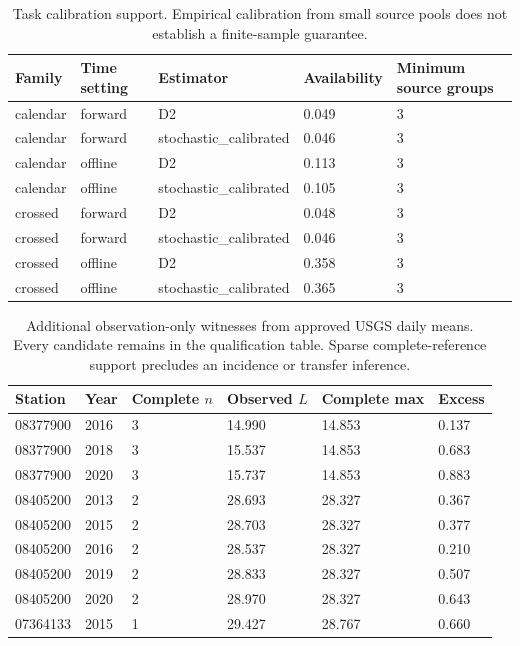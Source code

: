 \begin{table}[p]\centering\small
\caption{Task calibration support. Empirical calibration from small source pools does not establish a finite-sample guarantee.}\label{tab:task-calibration-support}
\begin{tabular}{lllll}
\toprule
Family & Time setting & Estimator & Availability & Minimum source groups\\\midrule
calendar & forward & D2 & 0.049 & 3\\
calendar & forward & stochastic\_calibrated & 0.046 & 3\\
calendar & offline & D2 & 0.113 & 3\\
calendar & offline & stochastic\_calibrated & 0.105 & 3\\
crossed & forward & D2 & 0.048 & 3\\
crossed & forward & stochastic\_calibrated & 0.046 & 3\\
crossed & offline & D2 & 0.358 & 3\\
crossed & offline & stochastic\_calibrated & 0.365 & 3\\
\bottomrule\end{tabular}
\end{table}
\begin{table}[p]\centering\small
\caption{Additional observation-only witnesses from approved USGS daily means. Every candidate remains in the qualification table. Sparse complete-reference support precludes an incidence or transfer inference.}\label{tab:additional-observed-records}
\begin{tabular}{llllll}
\toprule
Station & Year & Complete $n$ & Observed $L$ & Complete max & Excess\\\midrule
08377900 & 2016 & 3 & 14.990 & 14.853 & 0.137\\
08377900 & 2018 & 3 & 15.537 & 14.853 & 0.683\\
08377900 & 2020 & 3 & 15.737 & 14.853 & 0.883\\
08405200 & 2013 & 2 & 28.693 & 28.327 & 0.367\\
08405200 & 2015 & 2 & 28.703 & 28.327 & 0.377\\
08405200 & 2016 & 2 & 28.537 & 28.327 & 0.210\\
08405200 & 2019 & 2 & 28.833 & 28.327 & 0.507\\
08405200 & 2020 & 2 & 28.970 & 28.327 & 0.643\\
07364133 & 2015 & 1 & 29.427 & 28.767 & 0.660\\
\bottomrule\end{tabular}
\end{table}
